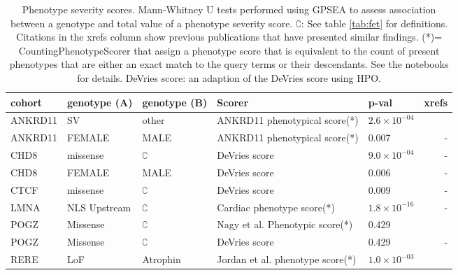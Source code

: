 \begin{table}
\centering
\begin{tabular}{l>{\raggedright\arraybackslash}p{2.5cm}>{\raggedright\arraybackslash}p{2.5cm}>{\raggedright}p{4cm}lr}
\toprule
\textbf{cohort} & \textbf{genotype (A)} & \textbf{genotype (B)} & \textbf{Scorer} & \textbf{p-val} & \textbf{xrefs}\\
\midrule
ANKRD11 & SV & other & ANKRD11 phenotypical score(*) & $2.6 \times 10^{-04}$ & \cite{PMID_36446582}\\
ANKRD11 & FEMALE & MALE & ANKRD11 phenotypical score(*) & 0.007 & -\\
CHD8 & missense & $\complement$ & DeVries score & $9.0 \times 10^{-04}$ & -\\
CHD8 & FEMALE & MALE & DeVries score & 0.006 & -\\
CTCF & missense & $\complement$ & DeVries score & 0.009 & -\\
LMNA & NLS Upstream & $\complement$ & Cardiac phenotype score(*)& $1.8 \times 10^{-16}$ & -\\
POGZ & Missense & $\complement$ &  Nagy et al. Phenotypic  score(*)  & 0.429 & \cite{PMID_35052493}\\
POGZ & Missense & $\complement$ &  DeVries score & 0.429 & -\\
RERE & LoF & Atrophin & Jordan et al.  phenotype score(*)  & $1.0 \times 10^{-03}$ & \cite{PMID_29330883}\\
\bottomrule
\end{tabular}
\caption{Phenotype severity scores. Mann-Whitney U tests performed using GPSEA to assess association between a genotype and total value of a phenotype severity score. $\complement$: See table \ref{tab:fet} for definitions.
    Citations in the xrefs column show previous publications that have presented similar findings. (*)= CountingPhenotypeScorer that assign a phenotype score that is equivalent to the count of present phenotypes that are either an exact match to the query terms or their descendants. See the notebooks for details. DeVries score: an adaption of the DeVries score \cite{PMID_34521999} using HPO.}
\label{tab:to_do}
\end{table}

\clearpage
\newpage








